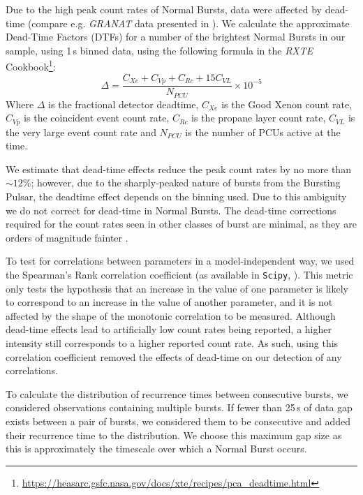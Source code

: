 \par Due to the high peak count rates of Normal Bursts, data were affected by dead-time (compare e.g. \textit{GRANAT} data presented in \citealp{Sazonov_BPGranat}).  We calculate the approximate Dead-Time Factors (DTFs) for a number of the brightest Normal Bursts in our sample, using 1\,s binned data, using the following formula in the \textit{RXTE} Cookbook\footnote{\url{https://heasarc.gsfc.nasa.gov/docs/xte/recipes/pca_deadtime.html}}:
\begin{equation}
\Delta=\frac{C_{Xe}+C_{Vp}+C_{Rc}+15C_{VL}}{N_{PCU}}\times10^{-5}
\end{equation}
Where $\Delta$ is the fractional detector deadtime, $C_{Xe}$ is the Good Xenon count rate, $C_{Vp}$ is the coincident event count rate, $C_{Rc}$ is the propane layer count rate, $C_{VL}$ is the very large event count rate and $N_{PCU}$ is the number of PCUs active at the time.
\par We estimate that dead-time effects reduce the peak count rates by no more than $\sim12$\%; however, due to the sharply-peaked nature of bursts from the Bursting Pulsar, the deadtime effect depends on the binning used.  Due to this ambiguity we do not correct for dead-time in Normal Bursts.  The dead-time corrections required for the count rates seen in other classes of burst are minimal, as they are orders of magnitude fainter \citep{Giles_BP}.
\par To test for correlations between parameters in a model-independent way, we used the Spearman's Rank correlation coefficient (as available in \texttt{Scipy}, \citealp{NumPy}).  This metric only tests the hypothesis that an increase in the value of one parameter is likely to correspond to an increase in the value of another parameter, and it is not affected by the shape of the monotonic correlation to be measured.  Although dead-time effects lead to artificially low count rates being reported, a higher intensity still corresponds to a higher reported count rate.   As such, using this correlation coefficient removed the effects of dead-time on our detection of any correlations.
\par To calculate the distribution of recurrence times between consecutive bursts, we considered observations containing multiple bursts.  If fewer than 25\,s of data gap exists between a pair of bursts, we considered them to be consecutive and added their recurrence time to the distribution.  We choose this maximum gap size as this is approximately the timescale over which a Normal Burst occurs.
